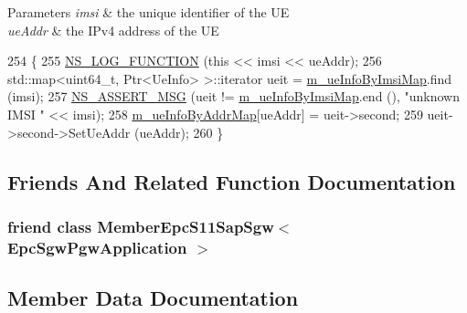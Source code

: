 \begin{DoxyParams}{Parameters}
{\em imsi} & the unique identifier of the UE \\
\hline
{\em ue\+Addr} & the I\+Pv4 address of the UE \\
\hline
\end{DoxyParams}

\begin{DoxyCode}
254 \{
255   \hyperlink{log-macros-disabled_8h_a90b90d5bad1f39cb1b64923ea94c0761}{NS\_LOG\_FUNCTION} (\textcolor{keyword}{this} << imsi << ueAddr);
256   std::map<uint64\_t, Ptr<UeInfo> >::iterator ueit = \hyperlink{classns3_1_1EpcSgwPgwApplication_ac026923e4b06703faf659f0584573531}{m\_ueInfoByImsiMap}.find (imsi);
257   \hyperlink{assert_8h_aff5ece9066c74e681e74999856f08539}{NS\_ASSERT\_MSG} (ueit != \hyperlink{classns3_1_1EpcSgwPgwApplication_ac026923e4b06703faf659f0584573531}{m\_ueInfoByImsiMap}.end (), \textcolor{stringliteral}{"unknown IMSI "} << imsi); 
258   \hyperlink{classns3_1_1EpcSgwPgwApplication_ac5d167ff997bd9618e832a371f45cba0}{m\_ueInfoByAddrMap}[ueAddr] = ueit->second;
259   ueit->second->SetUeAddr (ueAddr);
260 \}
\end{DoxyCode}


\subsection{Friends And Related Function Documentation}
\subsubsection[{\texorpdfstring{Member\+Epc\+S11\+Sap\+Sgw$<$ Epc\+Sgw\+Pgw\+Application $>$}{MemberEpcS11SapSgw< EpcSgwPgwApplication >}}]{\setlength{\rightskip}{0pt plus 5cm}friend class {\bf Member\+Epc\+S11\+Sap\+Sgw}$<$ {\bf Epc\+Sgw\+Pgw\+Application} $>$\hspace{0.3cm}{\ttfamily [friend]}}\hypertarget{classns3_1_1EpcSgwPgwApplication_a577f7e07cc928bffffc8fc7e445c0acc}{}\label{classns3_1_1EpcSgwPgwApplication_a577f7e07cc928bffffc8fc7e445c0acc}


\subsection{Member Data Documentation}
